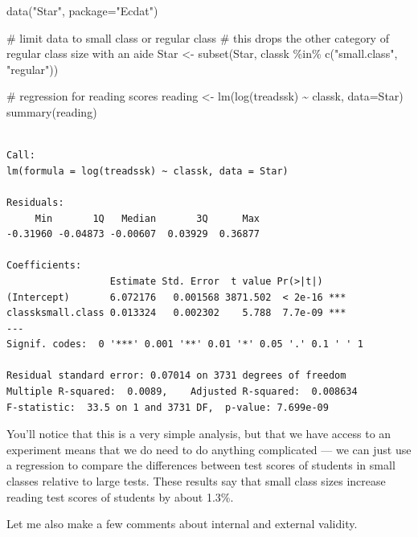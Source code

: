 \documentclass[
  letterpaper,
  DIV=11,
  numbers=noendperiod]{scrreprt}
\newenvironment{Shaded}{\begin{snugshade}}{\end{snugshade}}
\newcommand{\AttributeTok}[1]{\textcolor[rgb]{0.40,0.45,0.13}{#1}}
\newcommand{\CommentTok}[1]{\textcolor[rgb]{0.37,0.37,0.37}{#1}}
\newcommand{\FunctionTok}[1]{\textcolor[rgb]{0.28,0.35,0.67}{#1}}
\newcommand{\NormalTok}[1]{\textcolor[rgb]{0.00,0.23,0.31}{#1}}
\newcommand{\OtherTok}[1]{\textcolor[rgb]{0.00,0.23,0.31}{#1}}
\newcommand{\SpecialCharTok}[1]{\textcolor[rgb]{0.37,0.37,0.37}{#1}}
\newcommand{\StringTok}[1]{\textcolor[rgb]{0.13,0.47,0.30}{#1}}
\begin{document}
\begin{Shaded}
\begin{Highlighting}[]
\FunctionTok{data}\NormalTok{(}\StringTok{"Star"}\NormalTok{, }\AttributeTok{package=}\StringTok{"Ecdat"}\NormalTok{)}

\CommentTok{\# limit data to small class or regular class}
\CommentTok{\# this drops the other category of regular class size with an aide}
\NormalTok{Star }\OtherTok{\textless{}{-}} \FunctionTok{subset}\NormalTok{(Star, classk }\SpecialCharTok{\%in\%} \FunctionTok{c}\NormalTok{(}\StringTok{"small.class"}\NormalTok{, }\StringTok{"regular"}\NormalTok{))}

\CommentTok{\# regression for reading scores}
\NormalTok{reading }\OtherTok{\textless{}{-}} \FunctionTok{lm}\NormalTok{(}\FunctionTok{log}\NormalTok{(treadssk) }\SpecialCharTok{\textasciitilde{}}\NormalTok{ classk, }\AttributeTok{data=}\NormalTok{Star)}
\FunctionTok{summary}\NormalTok{(reading)}
\end{Highlighting}
\end{Shaded}

\begin{verbatim}

Call:
lm(formula = log(treadssk) ~ classk, data = Star)

Residuals:
     Min       1Q   Median       3Q      Max 
-0.31960 -0.04873 -0.00607  0.03929  0.36877 

Coefficients:
                  Estimate Std. Error  t value Pr(>|t|)    
(Intercept)       6.072176   0.001568 3871.502  < 2e-16 ***
classksmall.class 0.013324   0.002302    5.788  7.7e-09 ***
---
Signif. codes:  0 '***' 0.001 '**' 0.01 '*' 0.05 '.' 0.1 ' ' 1

Residual standard error: 0.07014 on 3731 degrees of freedom
Multiple R-squared:  0.0089,    Adjusted R-squared:  0.008634 
F-statistic:  33.5 on 1 and 3731 DF,  p-value: 7.699e-09
\end{verbatim}

You'll notice that this is a very simple analysis, but that we have
access to an experiment means that we do need to do anything complicated
--- we can just use a regression to compare the differences between test
scores of students in small classes relative to large tests. These
results say that small class sizes increase reading test scores of
students by about 1.3\%.

Let me also make a few comments about internal and external validity.
\end{document}
